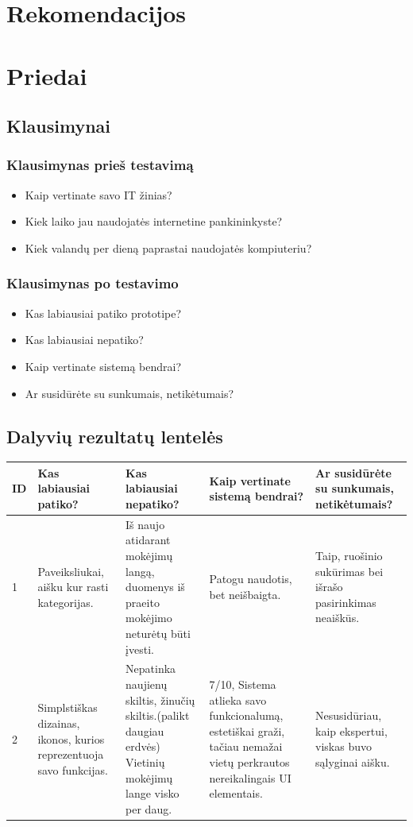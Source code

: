 \documentclass[oneside]{VUMIFPSkursinis}
\begin{document}
\section{Rekomendacijos}
\section{Priedai}
\subsection{Klausimynai}
\subsubsection{Klausimynas prieš testavimą}
\begin{itemize}
	\item Kaip vertinate savo IT žinias?
	\item Kiek laiko jau naudojatės internetine pankininkyste?
	\item Kiek valandų per dieną paprastai naudojatės kompiuteriu?
\end{itemize}
\subsubsection{Klausimynas po testavimo}
	\begin{itemize}
			\item Kas labiausiai patiko prototipe?
			\item Kas labiausiai nepatiko?
			\item Kaip vertinate sistemą bendrai?
			\item Ar susidūrėte su sunkumais, netikėtumais?
	\end{itemize}
\subsection{Dalyvių rezultatų lentelės}
\begin{center}
	\begin{tabular}{ |p{1cm} | p{3cm} | p{4cm} | p{4cm} | p{3cm} |}
	\hline
ID&Kas labiausiai patiko?&Kas labiausiai nepatiko?&Kaip vertinate sistemą bendrai?&Ar susidūrėte su sunkumais, netikėtumais?\\ \hline
1&Paveiksliukai, aišku kur rasti kategorijas.&Iš naujo atidarant mokėjimų langą, duomenys iš praeito mokėjimo neturėtų būti įvesti.&Patogu naudotis, bet neišbaigta.&Taip, ruošinio sukūrimas bei išrašo pasirinkimas neaiškūs. \\ \hline
2&Simplstiškas dizainas, ikonos, kurios reprezentuoja savo funkcijas.&Nepatinka naujienų skiltis, žinučių skiltis.(palikt daugiau erdvės) Vietinių mokėjimų lange visko per daug.&7/10, Sistema atlieka savo funkcionalumą, estetiškai graži, tačiau nemažai vietų perkrautos nereikalingais UI elementais. & Nesusidūriau, kaip ekspertui, viskas buvo sąlyginai aišku. \\ \hline

	\end{tabular}
\end{center}
\end{document}
